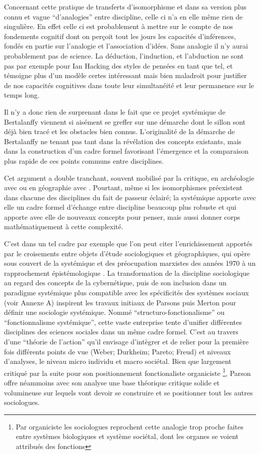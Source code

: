 Concernant cette pratique de transferts d'isomorphisme et dans sa version plus connu et vague \enquote{d'analogies} entre discipline, celle ci n'a en elle même rien de singulière. En effet celle ci est probablement à mettre sur le compte de nos fondements cognitif dont on perçoit tout les jours les capacités d'inférences, fondés en partie sur l’analogie et l'association d'idées. Sans analogie il n'y aurai probablement pas de science. La déduction, l'induction, et l'abduction ne sont pas par exemple pour Ian Hacking des styles de pensées en tant que tel, et témoigne plus d'un modèle certes intéressant mais bien maladroit pour justifier de nos capacités cognitives dans toute leur simultanéité et leur permanence sur le temps long.

Il n'y a donc rien de surprenant dans le fait que ce projet systémique de Bertalanffy viennent si aisément se greffer sur une démarche dont le sillon sont déjà bien tracé et les obstacles bien connus. L'originalité de la démarche de Bertalanffy ne tenant pas tant dans la révélation des concepts existants, mais dans la construction d'un cadre formel favorisant l'émergence et la comparaison plus rapide de ces points communs entre disciplines. 

Cet argument a double tranchant, souvent mobilisé par la critique, en archéologie avec \textcite{Salmon1978} ou en géographie avec \textcite{Chisholm1967}. Pourtant, même si les isomorphismes préexistent dans chacune des disciplines du fait de passeur éclairé; la systémique apporte avec elle un cadre formel d'échange entre discipline beaucoup plus robuste et qui apporte avec elle de nouveaux concepts pour penser, mais aussi donner corps mathématiquement à cette complexité.

C'est dans un tel cadre par exemple que l'on peut citer l'enrichissement apportés par le croisements entre objets d'étude sociologiques et géographiques, qui opère sous couvert de la systémique et des préocupation marxistes des années 1970 à un rapprochement épistémologique \autocite{Claval1995}. La transformation de la discipline sociologique au regard des concepts de la cybernétique, puis de son inclusion dans un paradigme systémique plus compatible avec les spécificités des systèmes sociaux (voir Annexe A) inspirent les travaux initiaux de Parsons puis Merton pour définir une sociologie systémique. Nommé \enquote{structuro-fonctionalisme} ou \enquote{fonctionnalisme systémique}, cette vaste entreprise tente d'unifier différentes disciplines des sciences sociales dans un même cadre formel. C'est au travers d'une \enquote{théorie de l'action}  qu'il envisage d'intègrer et de relier pour la première fois différents points de vue (Weber; Durkheim; Pareto; Freud) et niveaux d'analyses, le niveau micro individu et macro sociétal. Bien que largement critiqué par la suite pour son positionnement fonctionaliste organiciste \footnote{Par organiciste les sociologues reprochent cette analogie trop proche faites entre systèmes biologiques et système sociétal, dont les organes se voient attribués des fonctions}, Parson offre néammoins avec son analyse une base théorique critique solide et volumineuse sur lequels vont devoir se construire et se positionner tout les autres sociologues. 

